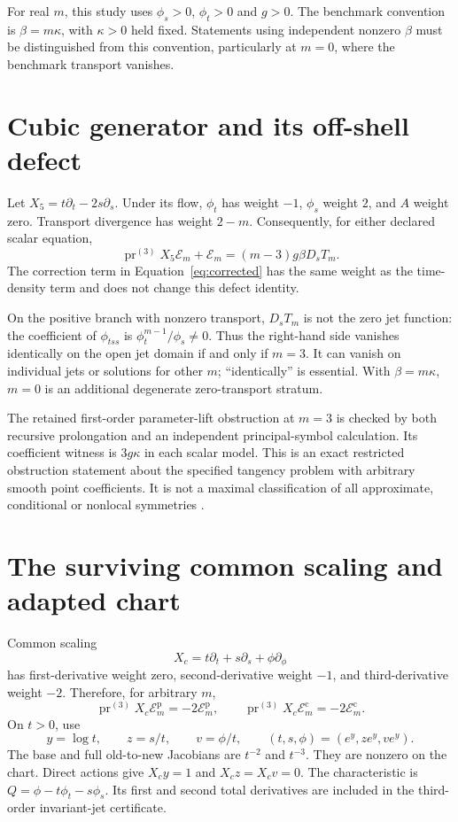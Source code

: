 \documentclass[12pt,a4paper,oneside]{report}
\numberwithin{equation}{chapter}
\newcommand{\E}{\mathcal E}
\newcommand{\pr}{\operatorname{pr}}
\begin{document}
For real $m$, this study uses $\phi_s>0$, $\phi_t>0$ and $g>0$.
The benchmark convention is $\beta=m\kappa$, with $\kappa>0$ held fixed.
Statements using independent nonzero $\beta$ must be distinguished from this
convention, particularly at $m=0$, where the benchmark transport vanishes.

\section{Cubic generator and its off-shell defect}
Let $X_5=t\partial_t-2s\partial_s$. Under its flow, $\phi_t$ has weight $-1$,
$\phi_s$ weight $2$, and $A$ weight zero. Transport divergence has weight
$2-m$. Consequently, for either declared scalar equation,
\begin{equation}\label{eq:defect}
\pr^{(3)}X_5\E_m+\E_m=(m-3)g\beta D_sT_m.
\end{equation}
The correction term in Equation~\eqref{eq:corrected} has the same weight as
the time-density term and does not change this defect identity.

On the positive branch with nonzero transport, $D_sT_m$ is not the zero jet
function: the coefficient of $\phi_{tss}$ is
$\phi_t^{m-1}/\phi_s\ne0$. Thus the right-hand side vanishes identically on
the open jet domain if and only if $m=3$. It can vanish on individual jets or
solutions for other $m$; ``identically'' is essential. With $\beta=m\kappa$,
$m=0$ is an additional degenerate zero-transport stratum.

The retained first-order parameter-lift obstruction at $m=3$ is checked by
both recursive prolongation and an independent principal-symbol calculation.
Its coefficient witness is $3g\kappa$ in each scalar model. This is an exact
restricted obstruction statement about the specified tangency problem with
arbitrary smooth point coefficients. It is not a maximal classification of
all approximate, conditional or nonlocal symmetries \cite{tarayrah2023}.

\section{The surviving common scaling and adapted chart}
Common scaling
\begin{equation}
X_c=t\partial_t+s\partial_s+\phi\partial_\phi
\end{equation}
has first-derivative weight zero, second-derivative weight $-1$, and
third-derivative weight $-2$. Therefore, for arbitrary $m$,
\begin{equation}\label{eq:commonidentity}
\pr^{(3)}X_c\E_m^{\mathrm p}=-2\E_m^{\mathrm p},\qquad
\pr^{(3)}X_c\E_m^{\mathrm c}=-2\E_m^{\mathrm c}.
\end{equation}
On $t>0$, use
\begin{equation}\label{eq:chart}
y=\log t,\qquad z=s/t,\qquad v=\phi/t,
\qquad (t,s,\phi)=(e^y,ze^y,ve^y).
\end{equation}
The base and full old-to-new Jacobians are $t^{-2}$ and $t^{-3}$.
They are nonzero on the chart. Direct actions give $X_cy=1$ and
$X_cz=X_cv=0$. The characteristic is
$Q=\phi-t\phi_t-s\phi_s$. Its first and second total derivatives are included
in the third-order invariant-jet certificate.
\end{document}
